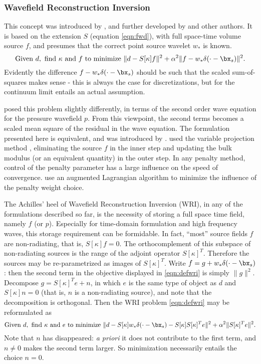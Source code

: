 \subsubsection{Wavefield Reconstruction Inversion}
This concept was introduced by \cite{LeeuwenHerrmannWRI:13}, and further
developed by \cite{LeeuwenHerrmann:16,WangYingst:SEG16} and other
authors. It is based on the extension $S$ (equation \ref{eqn:fwd}), with full
space-time volume source $f$, and presumes that the correct point
source wavelet $w_*$ is known. 
\begin{equation}
  \label{eqn:defwri}
  \mbox{Given } d, \mbox{ find }\kappa \mbox{ and }f \mbox{ to
    minimize }
  \| d -  S[\kappa]f\|^2+\alpha^2\|f-w_*\delta(\cdot-\bx_s)\|^2.
\end{equation}
Evidently the difference $f-w_*\delta(\cdot-\bx_s)$ should be such
that the scaled sum-of-squares makes sense - this is always the case
for discretizations, but for the continuum limit entails an actual
assumption.

\cite{LeeuwenHerrmannWRI:13} posed this problem slightly
differently, in terms of the second order wave equation for the
pressure wavefield $p$. From this viewpoint, the 
second terms becomes a scaled mean square of the residual in the
wave equation. The formulation presented here is equivalent, and was
introduced by \cite{WangYingst:SEG16}. \cite{LeeuwenHerrmann:16} used
the variable projection method \cite[]{GolubPereyra:03}, eliminating the source $f$ in the
inner step and updating the bulk modulus (or an equivalent quantity)
in the outer step. In any penalty method, control of the penalty
parameter has a large influence on the speed of
convergence. \cite{Aghamiry:19} use an augmented Lagrangian algorithm
to minimize the influence of the penalty weight choice.

The Achilles' heel of Wavefield Reconstruction Inversion (WRI), in any of
the formulations described so far, is the necessity of storing a full
space time field, namely $f$ (or $p$). Especially for time-domain
formulation and high frequency waves, this storage requirement can be
formidable. In fact, ``most'' source fields $f$ are non-radiating,
that is, $S[\kappa]f=0$. The orthocomplement of this subspace of
non-radiating sources is the range of the adjoint operator
$S[\kappa]^T$. Therefore the sources may be re-parametrized as images of
$S[\kappa]^T$. Write $f = g + w_*\delta(\cdot-\bx_s)$: then the second term in
the objective displayed in \ref{eqn:defwri} is simply $\|g\|^2$.
Decompose $g = S[\kappa]^Te + n$, in
which $e$ is the same type of object as $d$ and $S[\kappa]n=0$ (that
is, $n$ is a non-radiating
source), and note that the decomposition is orthogonal. Then the WRI problem \ref{eqn:defwri} may be reformulated as
\begin{equation}
  \label{eqn:defwrireform}
  \mbox{Given } d, \mbox{ find }\kappa \mbox{ and }e \mbox{ to
    minimize }
  \| d -  S[\kappa]w_*\delta(\cdot-\bx_s) - S[\kappa]S[\kappa]^Te\|^2+\alpha^2\|S[\kappa]^Te\|^2.
\end{equation}
Note that $n$ has disappeared: {\em a priori} it does not contribute to the first
term, and $n \ne 0$ makes the second term larger. So minimization
necessarily entails the choice $n=0$.

